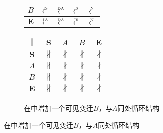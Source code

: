 \begin{figure}[htbp]
\begin{subfigure}{1\textwidth}
\begin{minipage}[b]{0.3\textwidth}
\begin{tabular}{|c|c|c|c|c|}
        $B$ & $\overset{\text{\tiny{IS}}}{\leftarrow}$ & $\overset{\text{\tiny{DA}}}{\leftarrow}$ & $\overset{\text{\tiny{IS}}}{\leftarrow}$ & $\overset{\text{\tiny{N}}}{\leftarrow}$\\ \hline
        $\bm{E}$ & $\overset{\text{\tiny{IA}}}{\leftarrow}$ & $\overset{\text{\tiny{DA}}}{\leftarrow}$ & $\overset{\text{\tiny{IS}}}{\leftarrow}$ & $\overset{\text{\tiny{N}}}{\leftarrow}$\\ \hline
      \end{tabular}
    \end{minipage}
    \begin{minipage}[b]{0.3\textwidth}
      \vspace{1em}
      \centering
      \begin{tabular}{|c|c|c|c|c|} \hline
        $\parallel$ & $\bm{S}$ & $A$ & $B$ & $\bm{E}$\\ \hline
        $\bm{S}$ & $\nparallel$ & $\nparallel$ & $\nparallel$ & $\nparallel$\\ \hline
        $A$ & $\nparallel$ & $\nparallel$ & $\nparallel$ & $\nparallel$\\ \hline
        $B$ & $\nparallel$ & $\nparallel$ & $\nparallel$ & $\nparallel$\\ \hline
        $\bm{E}$ & $\nparallel$ & $\nparallel$ & $\nparallel$ & $\nparallel$\\ \hline
      \end{tabular}
    \end{minipage}
    \caption{在中增加一个可见变迁$B$，与$A$同处循环结构}
    \label{fig:uniqueness_2_e}
  \end{subfigure}


\end{figure}
